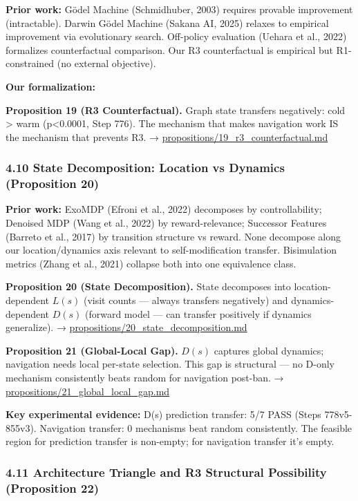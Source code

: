 \documentclass[
  11pt,
]{article}
\begin{document}
\textbf{Prior work:} Gödel Machine (Schmidhuber, 2003) requires provable
improvement (intractable). Darwin Gödel Machine (Sakana AI, 2025)
relaxes to empirical improvement via evolutionary search. Off-policy
evaluation (Uehara et al., 2022) formalizes counterfactual comparison.
Our R3 counterfactual is empirical but R1-constrained (no external
objective).

\textbf{Our formalization:}

\textbf{Proposition 19 (R3 Counterfactual).} Graph state transfers
negatively: cold \textgreater{} warm (p\textless0.0001, Step 776). The
mechanism that makes navigation work IS the mechanism that prevents R3.
→ \url{propositions/19_r3_counterfactual.md}

\subsubsection{4.10 State Decomposition: Location vs Dynamics
(Proposition
20)}\label{state-decomposition-location-vs-dynamics-proposition-20}

\textbf{Prior work:} ExoMDP (Efroni et al., 2022) decomposes by
controllability; Denoised MDP (Wang et al., 2022) by reward-relevance;
Successor Features (Barreto et al., 2017) by transition structure vs
reward. None decompose along our location/dynamics axis relevant to
self-modification transfer. Bisimulation metrics (Zhang et al., 2021)
collapse both into one equivalence class.

\textbf{Proposition 20 (State Decomposition).} State decomposes into
location-dependent \(L(s)\) (visit counts --- always transfers
negatively) and dynamics-dependent \(D(s)\) (forward model --- can
transfer positively if dynamics generalize). →
\url{propositions/20_state_decomposition.md}

\textbf{Proposition 21 (Global-Local Gap).} \(D(s)\) captures global
dynamics; navigation needs local per-state selection. This gap is
structural --- no D-only mechanism consistently beats random for
navigation post-ban. → \url{propositions/21_global_local_gap.md}

\textbf{Key experimental evidence:} D(s) prediction transfer: 5/7 PASS
(Steps 778v5-855v3). Navigation transfer: 0 mechanisms beat random
consistently. The feasible region for prediction transfer is non-empty;
for navigation transfer it's empty.

\subsubsection{4.11 Architecture Triangle and R3 Structural Possibility
(Proposition
22)}\label{architecture-triangle-and-r3-structural-possibility-proposition-22}
\end{document}
